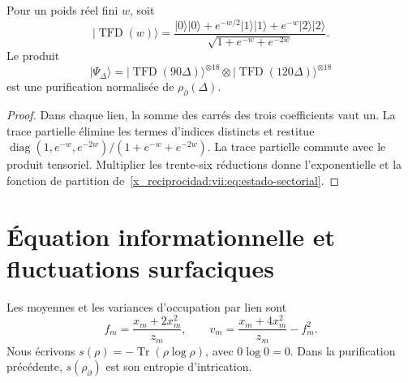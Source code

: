 \begin{proposition}
\label{x_reciprocidad:vii:prop:purificacion-sectorial}
Pour un poids réel fini \(w\), soit
\begin{equation}
 |\operatorname{TFD}(w)\rangle
 =\frac{|0\rangle|0\rangle+e^{-w/2}|1\rangle|1\rangle
                   +e^{-w}|2\rangle|2\rangle}
        {\sqrt{1+e^{-w}+e^{-2w}}}.
 \label{x_reciprocidad:vii:eq:tfd-local}
\end{equation}
Le produit
\begin{equation}
 |\Psi_\Delta\rangle
 =|\operatorname{TFD}(90\Delta)\rangle^{\otimes18}
  \otimes|\operatorname{TFD}(120\Delta)\rangle^{\otimes18}
 \label{x_reciprocidad:vii:eq:tfd-sectorial}
\end{equation}
est une purification normalisée de \(\rho_\partial(\Delta)\).
\end{proposition}
\begin{proof}
Dans chaque lien, la somme des carrés des trois coefficients vaut un.
La trace partielle élimine les termes d'indices distincts et restitue
\(\operatorname{diag}(1,e^{-w},e^{-2w})/(1+e^{-w}+e^{-2w})\).
La trace partielle commute avec le produit tensoriel. Multiplier les
trente-six réductions donne l'exponentielle et la fonction de partition
de~\eqref{x_reciprocidad:vii:eq:estado-sectorial}.
\end{proof}

\section{Équation informationnelle et fluctuations surfaciques}
\label{x_reciprocidad:vii:subsec:ecuacion-informacional}

Les moyennes et les variances d'occupation par lien sont
\begin{equation}
 f_m=\frac{x_m+2x_m^2}{z_m},\qquad
 v_m=\frac{x_m+4x_m^2}{z_m}-f_m^2.
 \label{x_reciprocidad:vii:eq:momentos-sectoriales}
\end{equation}
Nous écrivons \(s(\rho)=-\operatorname{Tr}(\rho\log\rho)\), avec \(0\log0=0\). Dans la purification précédente, \(s(\rho_\partial)\) est son entropie d'intrication.

